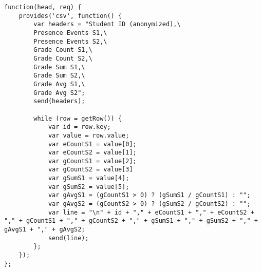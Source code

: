 \begin{verbatim}
function(head, req) {
    provides('csv', function() {
        var headers = "Student ID (anonymized),\
        Presence Events S1,\
        Presence Events S2,\
        Grade Count S1,\
        Grade Count S2,\
        Grade Sum S1,\
        Grade Sum S2,\
        Grade Avg S1,\
        Grade Avg S2";
        send(headers);

        while (row = getRow()) {
            var id = row.key;
            var value = row.value;
            var eCountS1 = value[0];
            var eCountS2 = value[1];
            var gCountS1 = value[2];
            var gCountS2 = value[3]
            var gSumS1 = value[4];
            var gSumS2 = value[5];
            var gAvgS1 = (gCountS1 > 0) ? (gSumS1 / gCountS1) : "";
            var gAvgS2 = (gCountS2 > 0) ? (gSumS2 / gCountS2) : "";
            var line = "\n" + id + "," + eCountS1 + "," + eCountS2 + "," + gCountS1 + "," + gCountS2 + "," + gSumS1 + "," + gSumS2 + "," + gAvgS1 + "," + gAvgS2;
            send(line);
        };
    });
};
\end{verbatim}